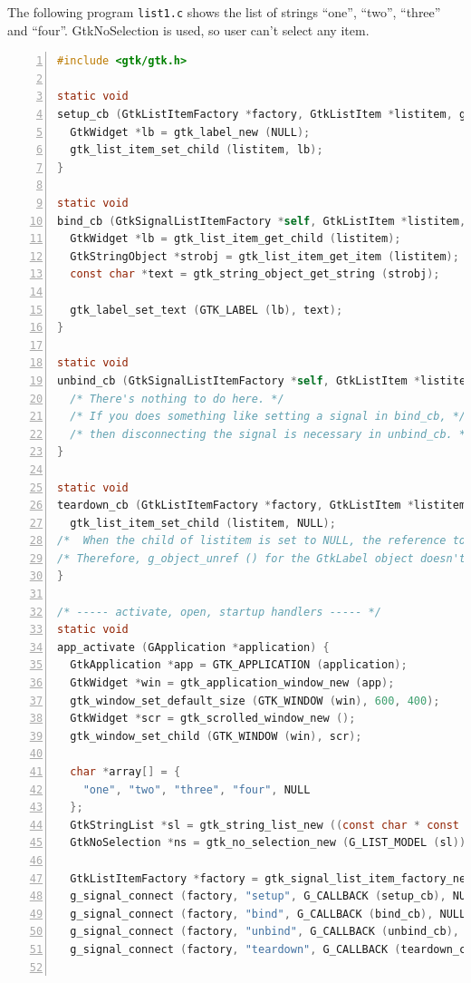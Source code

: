 The following program \passthrough{\lstinline!list1.c!} shows the list
of strings ``one'', ``two'', ``three'' and ``four''. GtkNoSelection is
used, so user can't select any item.

\begin{lstlisting}[language=C, numbers=left]
#include <gtk/gtk.h>

static void
setup_cb (GtkListItemFactory *factory, GtkListItem *listitem, gpointer user_data) {
  GtkWidget *lb = gtk_label_new (NULL);
  gtk_list_item_set_child (listitem, lb);
}

static void
bind_cb (GtkSignalListItemFactory *self, GtkListItem *listitem, gpointer user_data) {
  GtkWidget *lb = gtk_list_item_get_child (listitem);
  GtkStringObject *strobj = gtk_list_item_get_item (listitem);
  const char *text = gtk_string_object_get_string (strobj);

  gtk_label_set_text (GTK_LABEL (lb), text);
}

static void
unbind_cb (GtkSignalListItemFactory *self, GtkListItem *listitem, gpointer user_data) {
  /* There's nothing to do here. */
  /* If you does something like setting a signal in bind_cb, */
  /* then disconnecting the signal is necessary in unbind_cb. */
}

static void
teardown_cb (GtkListItemFactory *factory, GtkListItem *listitem, gpointer user_data) {
  gtk_list_item_set_child (listitem, NULL);
/*  When the child of listitem is set to NULL, the reference to GtkLabel will be released and lb will be destroyed. */
/* Therefore, g_object_unref () for the GtkLabel object doesn't need in the user code. */
}

/* ----- activate, open, startup handlers ----- */
static void
app_activate (GApplication *application) {
  GtkApplication *app = GTK_APPLICATION (application);
  GtkWidget *win = gtk_application_window_new (app);
  gtk_window_set_default_size (GTK_WINDOW (win), 600, 400);
  GtkWidget *scr = gtk_scrolled_window_new ();
  gtk_window_set_child (GTK_WINDOW (win), scr);

  char *array[] = {
    "one", "two", "three", "four", NULL
  };
  GtkStringList *sl = gtk_string_list_new ((const char * const *) array);
  GtkNoSelection *ns = gtk_no_selection_new (G_LIST_MODEL (sl));

  GtkListItemFactory *factory = gtk_signal_list_item_factory_new ();
  g_signal_connect (factory, "setup", G_CALLBACK (setup_cb), NULL);
  g_signal_connect (factory, "bind", G_CALLBACK (bind_cb), NULL);
  g_signal_connect (factory, "unbind", G_CALLBACK (unbind_cb), NULL);
  g_signal_connect (factory, "teardown", G_CALLBACK (teardown_cb), NULL);


\end{lstlisting}
